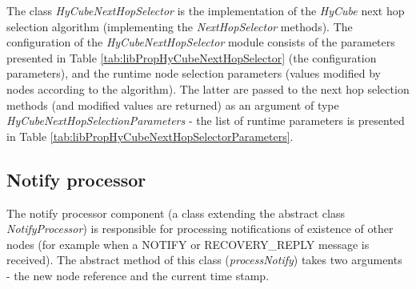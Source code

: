 The class \emph{HyCubeNextHopSelector} is the implementation of the \emph{HyCube} next hop selection algorithm (implementing the \emph{NextHopSelector} methods). The configuration of the \emph{HyCubeNextHopSelector} module consists of the parameters presented in Table \ref{tab:libPropHyCubeNextHopSelector} (the configuration parameters), and the runtime node selection parameters (values modified by nodes according to the algorithm). The latter are passed to the next hop selection methods (and modified values are returned) as an argument of type \emph{HyCubeNextHopSelectionParameters} - the list of runtime parameters is presented in Table \ref{tab:libPropHyCubeNextHopSelectorParameters}.







\subsection{Notify processor}

The notify processor component (a class extending the abstract class \emph{NotifyProcessor}) is responsible for processing notifications of existence of other nodes (for example when a NOTIFY or RECOVERY\_REPLY message is received). The abstract method of this class (\emph{processNotify}) takes two arguments - the new node reference and the current time stamp.


